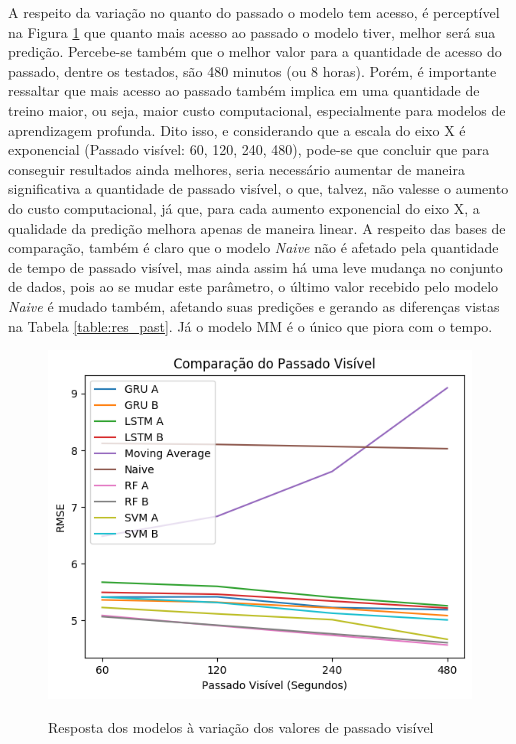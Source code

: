 A respeito da variação no quanto do passado o modelo tem acesso, é perceptível na Figura \ref{figure:res_past} que quanto mais acesso ao passado o modelo tiver, melhor será sua predição. Percebe-se também que o melhor valor para a quantidade de acesso do passado, dentre os testados, são 480 minutos (ou 8 horas). Porém, é importante ressaltar que mais acesso ao passado também implica em uma quantidade de treino maior, ou seja, maior custo computacional, especialmente para modelos de aprendizagem profunda. Dito isso, e considerando que a escala do eixo X é exponencial (Passado visível: 60, 120, 240, 480), pode-se que concluir que para conseguir resultados ainda melhores, seria necessário aumentar de maneira significativa a quantidade de passado visível, o que, talvez, não valesse o aumento do custo computacional, já que, para cada aumento exponencial do eixo X, a qualidade da predição melhora apenas de maneira linear. A respeito das bases de comparação, também é claro que o modelo \textit{Naive} não é afetado pela quantidade de tempo de passado visível, mas ainda assim há uma leve mudança no conjunto de dados, pois ao se mudar este parâmetro, o último valor recebido pelo modelo \textit{Naive} é mudado também, afetando suas predições e gerando as diferenças vistas na Tabela \ref{table:res_past}. Já o modelo \acrshort{MM} é o único que piora com o tempo. 


\begin{figure}[htbp]
    \centering
    \includegraphics[scale=0.8]{monography/img/comparisons/comparacao_do_passado_visivel_rmse.png}
    \label{figure:res_past}
    \caption[Resposta dos modelos à variação dos valores de passado visível]{Resposta dos modelos à variação dos valores de passado visível}
\end{figure}
 
